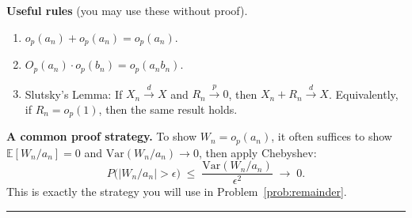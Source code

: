 \documentclass{article}
\newcommand{\Var}{\mathrm{Var}}
\newcommand{\op}{o_p}
\newcommand{\E}{\mathbb{E}}
\theoremstyle{definition}
\begin{document}
\medskip
\textbf{Useful rules} (you may use these without proof).
\begin{enumerate}[nosep,label=(\roman*)]
  \item $\op(a_n)+\op(a_n)=\op(a_n)$.
  \item $O_p(a_n)\cdot\op(b_n) = \op(a_n b_n)$.
\item Slutsky's Lemma:
If $X_n \xrightarrow{d} X$ and $R_n \xrightarrow{p} 0$,
then $X_n + R_n \xrightarrow{d} X$.
Equivalently, if $R_n = o_p(1)$, then the same result holds.

\end{enumerate}

\medskip
\textbf{A common proof strategy.}
To show $W_n = \op(a_n)$, it often suffices to show
$\E[W_n/a_n]=0$ and $\Var(W_n/a_n)\to 0$, then apply Chebyshev:
\[
  P\!\bigl(|W_n/a_n|>\epsilon\bigr)
  \;\leq\;
  \frac{\Var(W_n/a_n)}{\epsilon^2}
  \;\to\; 0.
\]
This is exactly the strategy you will use in Problem~\ref{prob:remainder}.

\bigskip
\hrule
\bigskip
\end{document}
